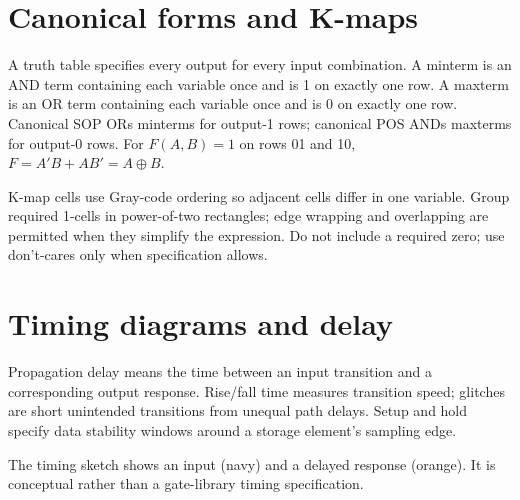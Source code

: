 \documentclass[11pt,a4paper]{article}
\begin{document}
\section{Canonical forms and K-maps}
A truth table specifies every output for every input combination. A minterm is an AND term containing each variable once and is 1 on exactly one row. A maxterm is an OR term containing each variable once and is 0 on exactly one row. Canonical SOP ORs minterms for output-1 rows; canonical POS ANDs maxterms for output-0 rows.
For $F(A,B)=1$ on rows 01 and 10, $F=A'B+AB'=A\oplus B$.
\begin{center}\end{center}
K-map cells use Gray-code ordering so adjacent cells differ in one variable. Group required 1-cells in power-of-two rectangles; edge wrapping and overlapping are permitted when they simplify the expression. Do not include a required zero; use don't-cares only when specification allows.
\section{Timing diagrams and delay}
Propagation delay means the time between an input transition and a corresponding output response. Rise/fall time measures transition speed; glitches are short unintended transitions from unequal path delays. Setup and hold specify data stability windows around a storage element's sampling edge.
\begin{center}\end{center}
The timing sketch shows an input (navy) and a delayed response (orange). It is conceptual rather than a gate-library timing specification.
\end{document}
